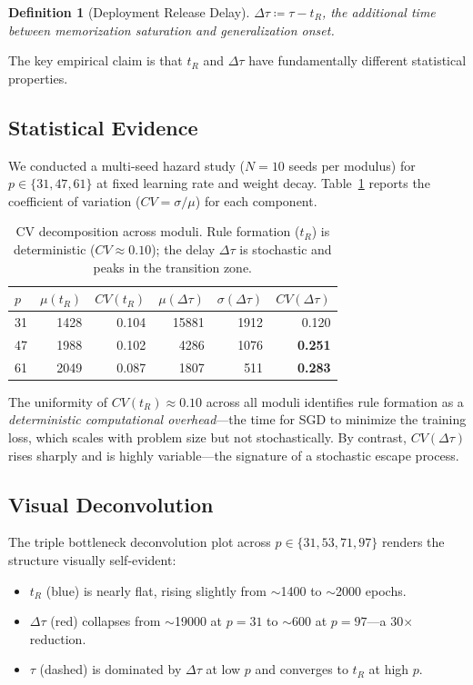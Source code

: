 \documentclass[11pt,twocolumn]{article}
\newtheorem{definition}{Definition}
\begin{document}
\begin{definition}[Deployment Release Delay]
$\Delta\tau \coloneqq \tau - t_R$, the additional time between memorization saturation and generalization onset.
\end{definition}

The key empirical claim is that $t_R$ and $\Delta\tau$ have fundamentally different statistical properties.

\subsection{Statistical Evidence}

We conducted a multi-seed hazard study ($N=10$ seeds per modulus) for $p \in \{31, 47, 61\}$ at fixed learning rate and weight decay. Table~\ref{tab:cv} reports the coefficient of variation ($CV = \sigma/\mu$) for each component.

\begin{table}[H]
\centering
\small
\begin{tabular}{@{}lrrrrr@{}}
\toprule
$p$ & $\mu(t_R)$ & $CV(t_R)$ & $\mu(\Delta\tau)$ & $\sigma(\Delta\tau)$ & $CV(\Delta\tau)$ \\
\midrule
31 & 1428 & 0.104 & 15881 & 1912 & 0.120 \\
47 & 1988 & 0.102 & 4286  & 1076 & \textbf{0.251} \\
61 & 2049 & 0.087 & 1807  & 511  & \textbf{0.283} \\
\bottomrule
\end{tabular}
\caption{CV decomposition across moduli. Rule formation ($t_R$) is deterministic ($CV \approx 0.10$); the delay $\Delta\tau$ is stochastic and peaks in the transition zone.}
\label{tab:cv}
\end{table}

The uniformity of $CV(t_R) \approx 0.10$ across all moduli identifies rule formation as a \emph{deterministic computational overhead}---the time for SGD to minimize the training loss, which scales with problem size but not stochastically. By contrast, $CV(\Delta\tau)$ rises sharply and is highly variable---the signature of a stochastic escape process.

\subsection{Visual Deconvolution}

The triple bottleneck deconvolution plot across $p \in \{31, 53, 71, 97\}$ renders the structure visually self-evident:
\begin{itemize}[itemsep=1pt]
\item $t_R$ (blue) is nearly flat, rising slightly from $\sim$1400 to $\sim$2000 epochs.
\item $\Delta\tau$ (red) collapses from $\sim$19000 at $p=31$ to $\sim$600 at $p=97$---a 30$\times$ reduction.
\item $\tau$ (dashed) is dominated by $\Delta\tau$ at low $p$ and converges to $t_R$ at high $p$.
\end{itemize}
\end{document}
